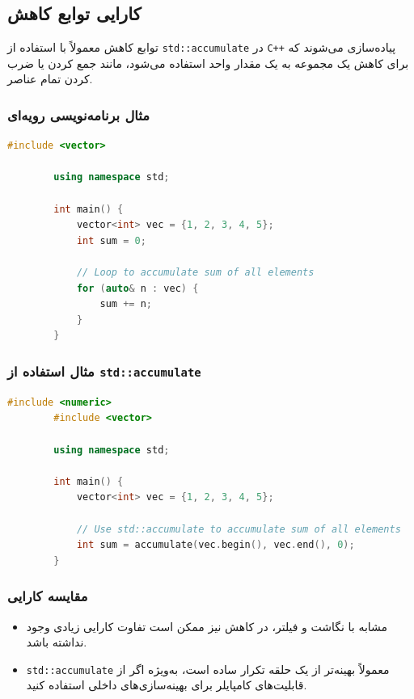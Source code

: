 \documentclass[12pt, a4paper]{report}
\begin{document}
\subsection{کارایی توابع کاهش}

توابع کاهش معمولاً با استفاده از \texttt{std::accumulate} در \texttt{C++} پیاده‌سازی می‌شوند که برای کاهش یک مجموعه به یک مقدار واحد استفاده می‌شود، مانند جمع کردن یا ضرب کردن تمام عناصر.

\subsubsection{مثال برنامه‌نویسی رویه‌ای}
\begin{LTR}
	\begin{lstlisting}[language=C++, breaklines=true]
		#include <vector>
		
		using namespace std;
		
		int main() {
			vector<int> vec = {1, 2, 3, 4, 5};
			int sum = 0;
			
			// Loop to accumulate sum of all elements
			for (auto& n : vec) {
				sum += n;
			}
		}
	\end{lstlisting}
\end{LTR}

\subsubsection{مثال استفاده از \texttt{std::accumulate}}
\begin{LTR}
	\begin{lstlisting}[language=C++, breaklines=true]
		#include <numeric>
		#include <vector>
		
		using namespace std;
		
		int main() {
			vector<int> vec = {1, 2, 3, 4, 5};
			
			// Use std::accumulate to accumulate sum of all elements
			int sum = accumulate(vec.begin(), vec.end(), 0);
		}
	\end{lstlisting}
\end{LTR}

\subsubsection{مقایسه کارایی}
\begin{itemize}
	\item مشابه با نگاشت و فیلتر، در کاهش نیز ممکن است تفاوت کارایی زیادی وجود نداشته باشد.
	\item \texttt{std::accumulate} معمولاً بهینه‌تر از یک حلقه تکرار ساده است، به‌ویژه اگر از قابلیت‌های کامپایلر برای بهینه‌سازی‌های داخلی استفاده کنید.
\end{itemize}
\end{document}
